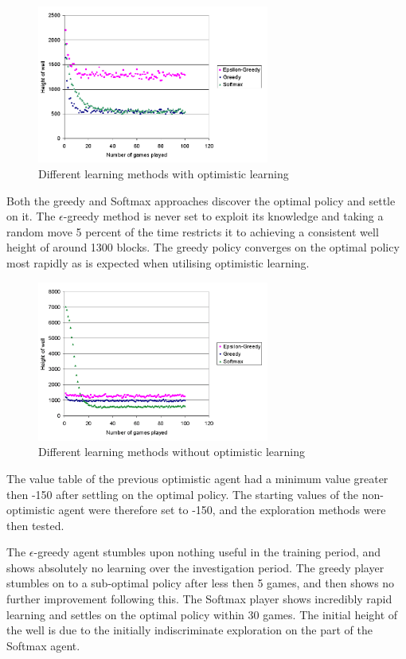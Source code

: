 \documentclass{rucsthesis}
\begin{document}
\begin{figure}[h]
\centering
\includegraphics[width=3in]{optomisticexp.png}
\caption{Different learning methods with optimistic learning}
\label{fig:compexpopt}
\end{figure}

Both the greedy and Softmax approaches discover the optimal policy and settle on it. The $\epsilon$-greedy method is never set to exploit its knowledge and taking a random move 5 percent of the time restricts it to achieving a consistent well height of around 1300 blocks. The greedy policy converges on the optimal policy most rapidly as is expected when utilising optimistic learning.

\begin{figure}[h]
\centering
\includegraphics[width=3in]{nonoptomisticexp.png}
\caption{Different learning methods without optimistic learning}
\label{fig:compexp}
\end{figure}

The value table of the previous optimistic agent had a minimum value greater then -150 after settling on the optimal policy. The starting values of the non-optimistic agent were therefore set to -150, and the exploration methods were then tested. 

The $\epsilon$-greedy agent stumbles upon nothing useful in the training period, and shows absolutely no learning over the investigation period. The greedy player stumbles on to a sub-optimal policy after less then 5 games, and then shows no further improvement following this. The Softmax player shows incredibly rapid learning and settles on the optimal policy within 30 games. The initial height of the well is due to the initially indiscriminate exploration on the part of the Softmax agent.
\end{document}
